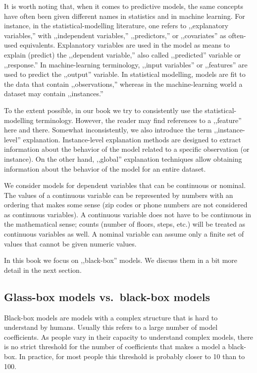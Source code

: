 \documentclass[12pt,]{krantz}
\theoremstyle{definition}
\theoremstyle{definition}
\theoremstyle{definition}
\theoremstyle{remark}
\begin{document}
It is worth noting that, when it comes to predictive models, the same
concepts have often been given different names in statistics and in
machine learning. For instance, in the statistical-modelling literature,
one refers to ,,explanatory variables,'' with ,,independent variables,''
,,predictors,'' or ,,covariates'' as often-used equivalents. Explanatory
variables are used in the model as means to explain (predict) the
,,dependent variable,'' also called ,,predicted'' variable or
,,response.'' In machine-learning terminology, ,,input variables'' or
,,features'' are used to predict the ,,output'' variable. In statistical
modelling, models are fit to the data that contain ,,observations,''
whereas in the machine-learning world a dataset may contain
,,instances.''

To the extent possible, in our book we try to consistently use the
statistical-modelling terminology. However, the reader may find
references to a ,,feature'' here and there. Somewhat inconsistently, we
also introduce the term ,,instance-level'' explanation. Instance-level
explanation methods are designed to extract information about the
behavior of the model related to a specific observation (or instance).
On the other hand, ,,global'' explanation techniques allow obtaining
information about the behavior of the model for an entire dataset.

We consider models for dependent variables that can be continuous or
nominal. The values of a continuous variable can be represented by
numbers with an ordering that makes some sense (zip codes or phone
numbers are not considered as continuous variables). A continuous
variable does not have to be continuous in the mathematical sense;
counts (number of floors, steps, etc.) will be treated as continuous
variables as well. A nominal variable can assume only a finite set of
values that cannot be given numeric values.

In this book we focus on ,,black-box'' models. We discuss them in a bit
more detail in the next section.

\hypertarget{glass-box-models-vs.black-box-models}{%
\subsection{Glass-box models vs.~black-box
models}\label{glass-box-models-vs.black-box-models}}

Black-box models are models with a complex structure that is hard to
understand by humans. Usually this refers to a large number of model
coefficients. As people vary in their capacity to understand complex
models, there is no strict threshold for the number of coefficients that
makes a model a black-box. In practice, for most people this threshold
is probably closer to 10 than to 100.
\end{document}
